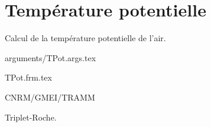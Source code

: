 %
\section{Temp\'erature potentielle}

 

Calcul de la temp\'erature potentielle de l'air.

\bigskip
 {arguments/TPot.args.tex}


{TPot.frm.tex}

CNRM/GMEI/TRAMM

Triplet-Roche\cite{Triplet-Roche}.


